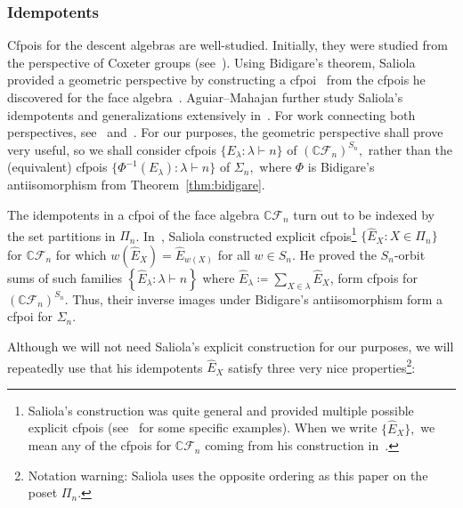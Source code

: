\documentclass[ALCO, Unicode]{cedram}
\def\C{{\mathbb{C}}}
\begin{document}
\subsubsection{Idempotents}\label{subsec:idemps}
Cfpois for the descent algebras are well-studied. Initially, they were studied from the perspective of Coxeter groups  (see~\cite{Bergerons-hyper1,Bergerons-general,  Bergerons-hyper2, garsia-reutenauer}). Using Bidigare's theorem, Saliola provided a geometric perspective by constructing a cfpoi~\cite{saliolaquiverdescalgebra} from the cfpois he discovered for the face algebra~\cite{saliolaquiverdescalgebra, saliolafacealgebra}. Aguiar--Mahajan further study Saliola's idempotents and generalizations extensively in~\cite{Aguiar-Mahajan}. For work connecting both perspectives, see~\cite{Brauner2022} and~\cite[\S 16]{Aguiar-Mahajan}. For our purposes, the geometric perspective shall prove very useful, so we shall consider cfpois $\{E_\lambda: \lambda \vdash n\}$ of $\left(\C \mathcal{F}_n \right)^{S_n},$ rather than the (equivalent) cfpois $\{\Phi^{-1}(E_\lambda): \lambda \vdash n\}$ of $\Sigma_n,$ where $\Phi$ is Bidigare's antiisomorphism from Theorem~\ref{thm:bidigare}. 

The idempotents in a cfpoi of the face algebra $\C\mathcal{F}_n$ turn out to be indexed by the set partitions in $\Pi_n$. In~\cite[\S 5]{saliolaquiverdescalgebra}, Saliola constructed {explicit cfpois}\footnote{Saliola's construction was quite general and provided multiple possible explicit cfpois (see~\cite[\S 5.1, 5.2] {saliolaquiverdescalgebra} for some specific examples). When we write $\{\widehat{E}_X\},$ we mean any of the cfpois for $\C \mathcal{F}_n$ coming from his construction in~\cite[Theorem 5.2]{saliolaquiverdescalgebra}.} $\{\widehat{E}_X: X \in \Pi_n\}$ for $\C \mathcal{F}_n$ for which $w \left(\widehat{E}_X\right) = \widehat{E}_{w(X)}$ for all $w \in S_n.$ He proved the $S_n$-orbit sums of such families $\left \{\widehat{E}_\lambda: \lambda \vdash n\right \}$ where $\widehat{E}_\lambda \coloneqq  \sum_{X \in \lambda} \widehat{E}_X$, form cfpois for $\left(\C \mathcal{F}_n\right)^{S_n}.$ Thus, their inverse images under Bidigare's antiisomorphism form a cfpoi for $\Sigma_n.$ 

Although we will not need Saliola's explicit construction for our purposes, we will repeatedly use that his idempotents $\widehat{E}_{X}$ satisfy three very nice {properties}\footnote{Notation warning: Saliola uses the opposite ordering as this paper on the poset $\Pi_n.$}:
\end{document}
